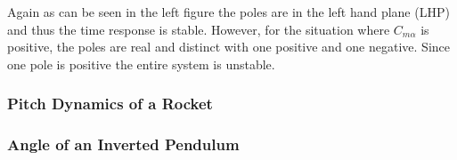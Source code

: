 Again as can be seen in the left figure the poles are in the left hand plane (LHP) and thus the time response is stable. However, for the situation where $C_{m\alpha}$ is positive, the poles are real and distinct with one positive and one negative. Since one pole is positive the entire system is unstable. 

\subsubsection{Pitch Dynamics of a Rocket}

\subsubsection{Angle of an Inverted Pendulum}
